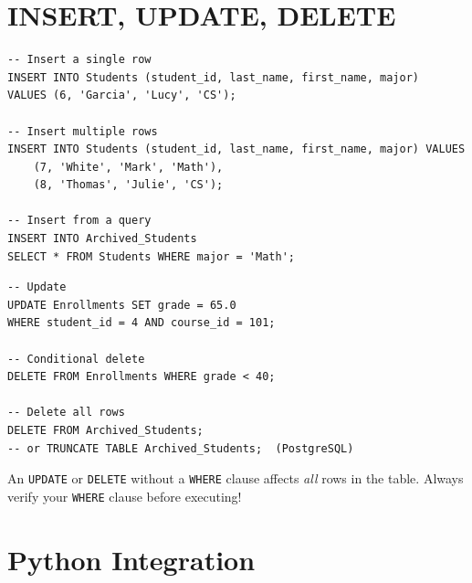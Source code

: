 \section{INSERT, UPDATE, DELETE}

\begin{codeblock}[title=\textbf{Inserting Data}]
\begin{verbatim}
-- Insert a single row
INSERT INTO Students (student_id, last_name, first_name, major)
VALUES (6, 'Garcia', 'Lucy', 'CS');

-- Insert multiple rows
INSERT INTO Students (student_id, last_name, first_name, major) VALUES
    (7, 'White', 'Mark', 'Math'),
    (8, 'Thomas', 'Julie', 'CS');

-- Insert from a query
INSERT INTO Archived_Students
SELECT * FROM Students WHERE major = 'Math';
\end{verbatim}
\end{codeblock}

\begin{codeblock}[title=\textbf{Updating and Deleting}]
\begin{verbatim}
-- Update
UPDATE Enrollments SET grade = 65.0
WHERE student_id = 4 AND course_id = 101;

-- Conditional delete
DELETE FROM Enrollments WHERE grade < 40;

-- Delete all rows
DELETE FROM Archived_Students;
-- or TRUNCATE TABLE Archived_Students;  (PostgreSQL)
\end{verbatim}
\end{codeblock}

\begin{warning}[title=\textbf{UPDATE/DELETE Without WHERE}]
An \texttt{UPDATE} or \texttt{DELETE} without a \texttt{WHERE} clause affects
\emph{all} rows in the table. Always verify your \texttt{WHERE} clause
before executing!
\end{warning}

\section{Python Integration}

